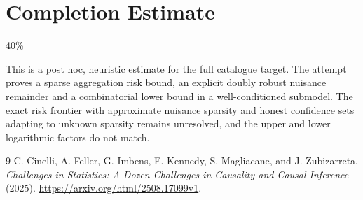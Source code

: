 \documentclass[11pt]{article}
\theoremstyle{remark}
\begin{document}
\section{Completion Estimate}
40\%

This is a post hoc, heuristic estimate for the full catalogue target.
The attempt proves a sparse aggregation risk bound, an explicit doubly robust nuisance remainder and a combinatorial lower bound in a well-conditioned submodel. The exact risk frontier with approximate nuisance sparsity and honest confidence sets adapting to unknown sparsity remains unresolved, and the upper and lower logarithmic factors do not match.

\begin{thebibliography}{9}
 C. Cinelli, A. Feller, G. Imbens, E. Kennedy, S. Magliacane, and J. Zubizarreta. \emph{Challenges in Statistics: A Dozen Challenges in Causality and Causal Inference} (2025). \url{https://arxiv.org/html/2508.17099v1}.
\end{thebibliography}
\end{document}
